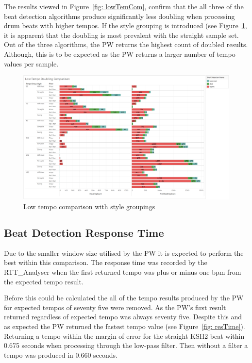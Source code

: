 \documentclass[a4paper, 11pt]{article}
\begin{document}
The results viewed in Figure~\ref{fig: lowTemCom}, confirm that the all three of the beat detection algorithms produce significantly less doubling when processing drum beats with higher tempos. If the style grouping is introduced (see Figure~\ref{fig: lowTemComStyle}, it is apparent that the doubling is most prevalent with the straight sample set. Out of the three algorithms, the PW returns the highest count of doubled results. Although, this is to be expected as the PW returns a larger number of tempo values per sample.

\begin{figure}
\centering
\includegraphics[scale=0.25]{images/lowStyle.jpg}
\caption{Low tempo comparison with style groupings}
\label{fig: lowTemComStyle}
\end{figure}

\subsection{Beat Detection Response Time}
Due to the smaller window size utilised by the PW it is expected to perform the best within this comparison. The response time was recorded by the RTT\_Analyser when the first returned tempo was plus or minus one bpm from the expected tempo result. 

Before this could be calculated the all of the tempo results produced by the PW for expected tempos of seventy five were removed. As the PW's first result returned regardless of expected tempo was always seventy five. Despite this and as expected the PW returned the fastest tempo value (see Figure~\ref{fig: resTime}). Returning a tempo within the margin of error for the straight KSH2 beat within 0.675 seconds when processing through the low-pass filter. Then without a filter a tempo was produced in 0.660 seconds. 
\end{document}
